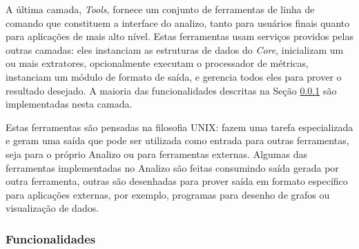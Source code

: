 A última camada, {\it Tools}, fornece um conjunto de ferramentas de linha de comando que
constituem a interface do analizo, tanto para usuários finais quanto para
aplicações de mais alto nível. Estas ferramentas usam serviços providos pelas
outras camadas: eles instanciam as estruturas de dados do {\it Core},
inicializam um ou mais extratores, opcionalmente executam o processador de
métricas, instanciam um módulo de formato de saída, e gerencia todos eles para
prover o resultado desejado. A maioria das funcionalidades descritas na Seção
\ref{funcionalidades} são implementadas nesta camada.

Estas ferramentas são pensadas na filosofia UNIX: fazem uma tarefa
especializada e geram uma saída que pode ser utilizada como entrada para outras
ferramentas, seja para o próprio Analizo ou para ferramentas externas. Algumas
das ferramentas implementadas no Analizo são feitas consumindo saída gerada por
outra ferramenta, outras são desenhadas para prover saída em formato específico
para aplicações externas, por exemplo, programas para desenho de grafos ou
visualização de dados.

\subsubsection{Funcionalidades}\label{funcionalidades}

